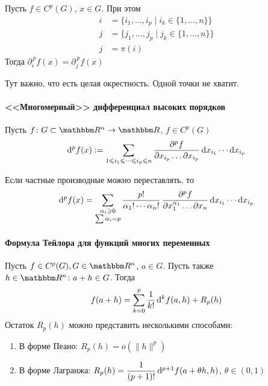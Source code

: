 \documentclass[12pt,timbord]{../../../notes}
\begin{document}
\begin{thrm}
  \label{thrm:diffspace::highpartial::permut}
  Пусть \mbox{$f \in C^p(G)$}, $x\in G$. При этом
  \[
    \begin{split}
      i &= \{ i_1, \dotsc, i_p \mid i_k \in \{1, \dotsc, n\}\} \\
      j &= \{ j_1, \dotsc, j_p \mid j_k \in \{1, \dotsc, n\}\} \\
      j &= \pi(i)
    \end{split}
  \]
  Тогда 
  $\partial_i^{\,p} f(x) = \partial_j^{\,p} f(x)$
\end{thrm}
\begin{rem}\label{rem:diffspace::highpartial::permut}
  Тут важно, что есть целая окрестность. Одной точки не хватит.
\end{rem}

\paragraph{<<Многомерный>> дифференциал высоких порядков}
\label{par:diffspace::highdiff}

\begin{defn}\label{defn:diffspace::highdiff}
  Пусть $f \colon G \subset \R^n \to \R$, $f\in C^p(G)$
  \[  
    \mathrm{d}^p f(x) := \sum_{1 \leqslant i_1 \leqslant \dotsb \leqslant i_p \leqslant n}
    \frac{\partial^p f}{\partial x_{i_p} \dotso \partial x_{i_p}} \, \mathrm{d} x_{i_1} \dotsm \mathrm{d} x_{i_p}
  \]
\end{defn}

\begin{stat}\label{stat:diffspace::highdiff::binom}
  Если частные производные можно переставлять, то
  \[
    \mathrm{d}^p f(x) = \sum_{\substack{\alpha_i \geqslant 0 \\ \sum \alpha_i = p}} 
    \frac{p!}{\alpha_1! \dotsm \alpha_n!} \, 
    \frac{\partial^p f}{\partial x_1^{\alpha_1}\dotso \partial x_n} \,\mathrm{d} x_{i_1} \dotsm \mathrm{d} x_{i_p}
  \]
\end{stat}

\paragraph{Формула Тейлора для функций многих переменных}
\label{par:diffspace::taylor}

\begin{thrm}\label{thrm:diffspace::taylor}
  Пусть $f \in C^p(G), G\in \R^n$, $a\in G$. Пусть также $h\in \R^n \colon a+h \in G$.
  Тогда 
  \[
    f(a+h) = \sum_{k=0}^p \frac{1}{k!} \, \mathrm{d}^k f(a,h) + R_p(h)
  \]
  Остаток $R_p(h)$ можно представить несколькими способами:
  \begin{enumerate}
    \item В форме Пеано: $R_p(h) = o(\|h\|^p)$
    \item В форме Лагранжа: $R_p(h) = \dfrac{1}{(p+1)!}\, \mathrm{d}^{p+1} f(a + \theta h, h)$, 
      $\theta \in (0,1)$
  \end{enumerate}

\end{thrm}
\end{document}
